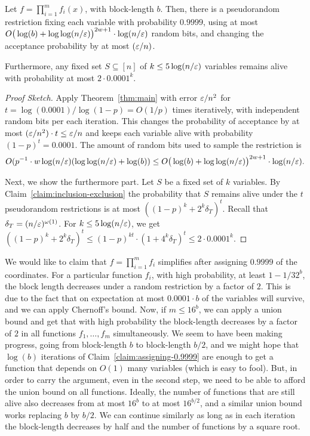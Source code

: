 \begin{claim}\label{claim:assigning-0.9999}
Let $f = \prod_{i=1}^{m} f_i(x)$, with block-length $b$.
Then, there is a pseudorandom restriction fixing each variable with probability $0.9999$, using at most $
 O\big(\log(b) +\log\log(n/\varepsilon)\big)^{2w+1} \cdot \log(n/\varepsilon)$ random bits, and changing the acceptance probability by at most $(\varepsilon/n)$.

Furthermore, any fixed set $S\subseteq[n]$ of  $k \le 5\log(n/\varepsilon)$ variables remains alive with probability at most $2 \cdot 0.0001^k$.
\end{claim}
\begin{proof}[Proof Sketch]
Apply Theorem~\ref{thm:main} with error $\varepsilon/n^2$ for $t = \log(0.0001)/\log(1-p) = O(1/p)$ times iteratively, with independent random bits per each iteration. This changes the probability of acceptance by at most $(\varepsilon/n^2)\cdot t \le \varepsilon/n$ and keeps each variable alive with probability $(1-p)^{t} =0.0001$.
The amount of random bits used to sample the restriction is 
$$O(p^{-1}
 \cdot w  \log (n/\varepsilon)  (\log\log(n/\varepsilon) +  \log(b))
 \le 
 O\big(\log(b) +\log\log(n/\varepsilon)\big)^{2w+1} \cdot \log(n/\varepsilon).$$

Next, we show the furthermore part. Let $S$ be a fixed set of $k$ variables. By Claim~\ref{claim:inclusion-exclusion} the probability that $S$  remains alive under the $t$ pseudorandom restrictions is at most $((1-p)^{k} + 2^{k}\delta_T)^t$. 
Recall that $\delta_T = (n/\varepsilon)^{\omega(1)}$.
For $k \le 5 \log(n/\varepsilon)$, we get 
$((1-p)^{k} + 2^{k} \delta_T)^t \le (1-p)^{kt} \cdot (1+4^{k}\delta_T)^{t} \le 2\cdot 0.0001^{k}$.
\end{proof}


We would like to claim that $f = \prod_{i=1}^{m}f_i$ simplifies after assigning $0.9999$ of the coordinates. 
For a particular function $f_i$, with high probability, at least $1-1/32^b$, the block length decreases under a random restriction by a factor of $2$.
This is due to the fact that on expectation  at most $0.0001\cdot b$ of the variables will survive, and we can apply Chernoff's bound.
Now, if $m\le 16^b$, we can apply a union bound and get that with high probability the block-length decreases by a factor of $2$ in all functions $f_1, \ldots, f_m$ simultaneously.
We seem to have been making progress, going from block-length $b$ to block-length $b/2$, and we might hope that $\log(b)$ iterations of Claim~\ref{claim:assigning-0.9999} are enough to get a function that depends on $O(1)$ many variables (which is easy to fool). 
But, in order to carry the argument, even in the second step, we need to be able to afford the union bound on all functions. 
Ideally, the number of functions that are still alive also decreases from at most $16^b$ to at most $16^{b/2}$, and a similar union bound works replacing $b$ by $b/2$. We can continue similarly as long as in each iteration the block-length decreases by half and the number of functions by a square root.

